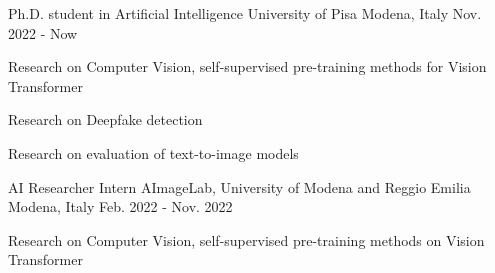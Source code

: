 
\begin{cventries}
  \cventry
    {Ph.D. student in Artificial Intelligence} %
    {University of Pisa} %
    {Modena, Italy} %
    {Nov. 2022 - Now} %
    {
      \begin{cvitems} %
        \item {Research on Computer Vision, self-supervised pre-training methods for Vision Transformer}
        \item {Research on Deepfake detection}
        \item {Research on evaluation of text-to-image models}
      \end{cvitems}
    }
    
  \cventry
    {AI Researcher Intern} %
    {AImageLab, University of Modena and Reggio Emilia} %
    {Modena, Italy} %
    {Feb. 2022 - Nov. 2022} %
    {
      \begin{cvitems} %
        \item {Research on Computer Vision, self-supervised pre-training methods on Vision Transformer }
      \end{cvitems}
    }

\end{cventries}


